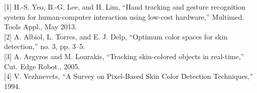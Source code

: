 \documentclass{article}
\begin{document}
[1] H.-S. Yeo, B.-G. Lee, and H. Lim, “Hand tracking and gesture recognition system for human-computer interaction using low-cost hardware,” Multimed. Tools Appl., May 2013.
\\[1cm]
[2] A. Albiol, L. Torres, and E. J. Delp, “Optimum color spaces for skin detection,” no. 3, pp. 3–5.
\\[1cm]
[3] A. Argyros and M. Lourakis, “Tracking skin-colored objects in real-time,” Cut. Edge Robot., 2005.
\\[1cm]
[4] V. Vezhnevets, “A Survey on Pixel-Based Skin Color Detection Techniques,” 1994.
\end{document}
